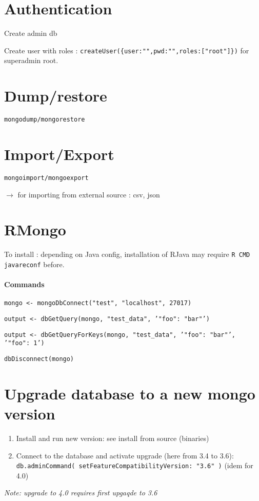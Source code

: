 \section*{Authentication}

Create admin db

Create user with roles : \texttt{createUser(\{user:"",pwd:"",roles:["root"]\})} for superadmin root.


\section*{Dump/restore}

\texttt{mongodump/mongorestore}


\section*{Import/Export}

\texttt{mongoimport/mongoexport}

$\rightarrow$ for importing from external source : csv, json



\section*{RMongo}

To install : depending on Java config, installation of RJava may require \texttt{R CMD javareconf} before.


\paragraph{Commands}

\texttt{mongo <- mongoDbConnect("test", "localhost", 27017)}

\texttt{output <- dbGetQuery(mongo, "test_data",
'{"foo": "bar"}')}

\texttt{output <- dbGetQueryForKeys(mongo, "test_data",
'{"foo": "bar"}', '{"foo": 1}')}

\texttt{dbDisconnect(mongo)}




\section*{Upgrade database to a new mongo version}

\begin{enumerate}
	\item Install and run new version: see install from source (binaries)
	\item Connect to the database and activate upgrade (here from 3.4 to 3.6): \texttt{db.adminCommand({ setFeatureCompatibilityVersion: "3.6" })} (idem for 4.0)
\end{enumerate}

\textit{Note: upgrade to 4.0 requires first upgaqde to 3.6}













